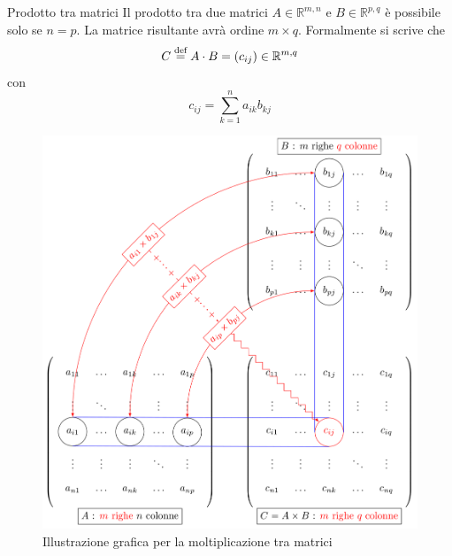 \begin{Def}{Prodotto tra matrici}\label{def:matrice_prodotto}
  Il prodotto tra due matrici $A\in\mathbb{R}^{m,n}$ e $B\in\mathbb{R}^{p,q}$ è
  possibile solo se $n=p$. La matrice risultante avrà ordine $m\times q$.
  Formalmente si scrive che
  \begin{equation*}
    C \overset{\text{def}}{=} A\cdot B = (c_{ij})\in\mathbb{R}^{m,q}
  \end{equation*}
  con
  \begin{equation*}
    c_{ij} = \sum^{n}_{k=1} a_{ik}b_{kj}
  \end{equation*}
  \begin{figure}[!htbp]
    \centering
    \includegraphics[width=0.6\linewidth]{images/matrMult.png}
    \caption{Illustrazione grafica per la moltiplicazione tra matrici}
    \label{fig:matrMult}
  \end{figure}
\end{Def}


